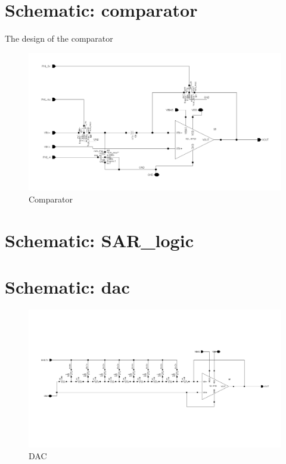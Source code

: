 \documentclass[english, a4paper,11pt]{article}
\begin{document}
\section*{Schematic: comparator}
The design of the comparator 
\begin{figure}[!ht]
 \centering
   \includegraphics[width=\textwidth]{img/comparator}
   \caption{Comparator}
   \label{comparator}
\end{figure}
\section*{Schematic: SAR\_logic}
\section*{Schematic: dac}
\begin{figure}[!ht]
 \centering
   \includegraphics[width=\textwidth]{img/dac}
   \caption{DAC}
   \label{dac}
\end{figure}
\end{document}
